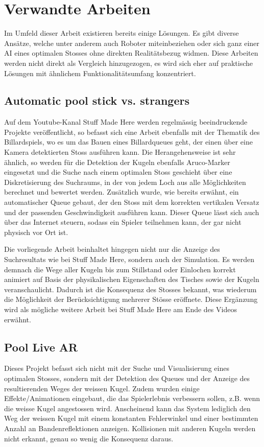 \section{Verwandte Arbeiten}
Im Umfeld dieser Arbeit existieren bereits einige Lösungen. Es gibt diverse Ansätze, welche
unter anderem auch Roboter miteinbeziehen\cite{qucosa:ein_billardroboter:1} oder sich ganz einer AI eines
optimalen Stosses ohne direkten Realitätsbezug widmen\cite{inproceedings:billiard_ai:1}. Diese Arbeiten werden nicht
direkt als Vergleich hinzugezogen, es wird sich eher auf praktische Lösungen mit ähnlichem Funktionalitätsumfang
konzentriert.

\subsection{Automatic pool stick vs. strangers}
Auf dem Youtube-Kanal \glqq Stuff Made Here\grqq{} werden regelmässig beeindruckende Projekte veröffentlicht, so befasst
sich eine Arbeit ebenfalls mit der Thematik des Billardspiels, wo es um das Bauen eines Billardqueues geht, der einen
über eine Kamera detektierten Stoss ausführen kann\cite{stuffmadehere:automaticpoolstick}. Die Herangehensweise ist
sehr ähnlich, so werden für die Detektion der Kugeln ebenfalls Aruco-Marker eingesetzt und die Suche nach einem optimalen
Stoss geschieht über eine Diskretisierung des Suchraums, in der von jedem Loch aus alle Möglichkeiten berechnet und
bewertet werden. Zusätzlich wurde, wie bereits erwähnt, ein automatischer Queue gebaut, der den Stoss mit dem korrekten
vertikalen Versatz und der passenden Geschwindigkeit ausführen kann. Dieser Queue lässt sich auch über das Internet
steuern, sodass ein Spieler teilnehmen kann, der gar nicht physisch vor Ort ist.

Die vorliegende Arbeit beinhaltet hingegen nicht nur die Anzeige des Suchresultats wie bei \glqq Stuff Made Here\grqq{},
sondern auch der Simulation. Es werden demnach die Wege aller Kugeln bis zum
Stillstand oder Einlochen korrekt animiert auf Basis der physikalischen Eigenschaften des Tisches sowie der Kugeln
veranschaulicht. Dadurch ist die Konsequenz des Stosses bekannt, was wiederum die Möglichkeit der Berücksichtigung
mehrerer Stösse eröffnete. Diese Ergänzung wird als mögliche weitere Arbeit bei \glqq Stuff Made Here\grqq{} am Ende
des Videos erwähnt.

\subsection{Pool Live AR}
Dieses Projekt befasst sich nicht mit der Suche und Visualisierung eines optimalen Stosses, sondern mit der
Detektion des Queues und der Anzeige des resultierenden Weges der weissen Kugel\cite{poollivear}. Zudem wurden einige
Effekte/Animationen eingebaut, die das Spielerlebnis verbessern sollen, z.B. wenn die weisse Kugel angestossen wird.
Anscheinend kann das System lediglich den Weg der weissen  Kugel mit einem konstanten Fehlerwinkel und einer bestimmten Anzahl an
Bandenreflektionen anzeigen. Kollisionen mit anderen Kugeln werden nicht erkannt, genau so wenig die Konsequenz daraus.

